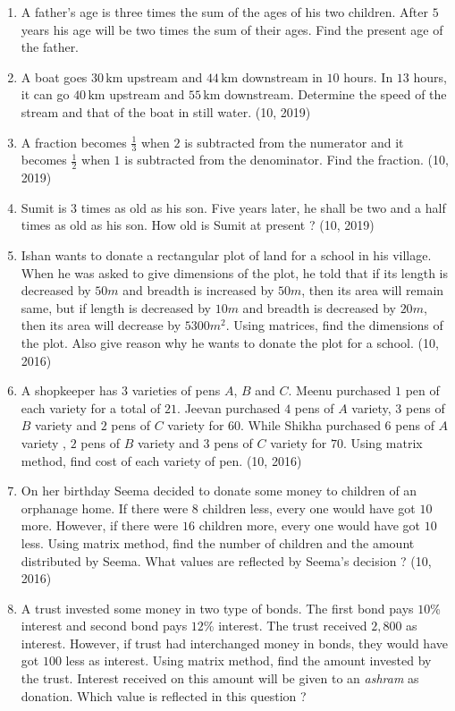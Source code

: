 \begin{enumerate}[label=\thesubsection.\arabic*, ref=\thesubsection.\theenumi]
\item A father's age is three times the sum of the ages of his two children. After $5$ years his age will be two times the sum of their ages. Find the present age of the father.
\item A boat goes $30 \,\text{km}$ upstream and $44 \,\text{km}$ downstream in $10$ hours. In $13$ hours, it can go $40\,\text{km}$ upstream and $55 \,\text{km}$ downstream. Determine the speed of the stream and that of the boat in still water.
\hfill (10, 2019)

\item A fraction becomes $\frac{1}{3}$ when $2$ is subtracted from the numerator and it becomes $\frac{1}{2}$ when $1$ is subtracted from the denominator. Find the fraction.
\hfill (10, 2019)

\item Sumit is $3$ times as old as his son. Five years later, he shall be two and a half times as old as his son. How old is Sumit at present ?
\hfill (10, 2019)
    \item Ishan wants to donate a rectangular plot of land for a school in his village. When he was asked to give dimensions of the plot, he told that if its length is decreased by $50m$ and breadth is increased by $50m$, then its area will remain same, but if length is decreased by $10m$ and breadth is decreased by $20m$, then its area will decrease by $5300m^2$. Using matrices, find the dimensions of the plot. Also give reason why he wants to donate the plot for a school.
\hfill (10, 2016)
    \item A shopkeeper has $3$ varieties of pens $A$, $B$ and $C$. Meenu purchased $1$ pen of each variety for a total of \rupee $21$. Jeevan purchased $4$ pens of $A$ variety, $3$ pens of $B$ variety and $2$ pens of $C$ variety for \rupee $60$. While Shikha purchased $6$ pens of $A$ variety , $2$ pens of $B$ variety and $3$ pens of $C$ variety for \rupee $70$. Using matrix method, find cost of each variety of pen.
\hfill (10, 2016)
    \item On her birthday Seema decided to donate some money to children of an orphanage home. If there were $8$ children less, every one would have got \rupee $10$ more. However, if there were $16$ children more, every one would have got \rupee $10$ less. Using matrix method, find the number of children and the amount distributed by Seema. What values are reflected by Seema's decision ?
\hfill (10, 2016)
    \item A trust invested some money in two type of bonds. The first bond pays $10$\% interest and second bond pays $12$\% interest. The trust received \rupee $2,800$ as interest. However, if trust had interchanged money in bonds, they would have got \rupee $100$ less as interest. Using matrix method, find the amount invested by the trust. Interest received on this amount will be given to an {\em ashram} as donation. Which value is reflected in this question ?

\end{enumerate}
